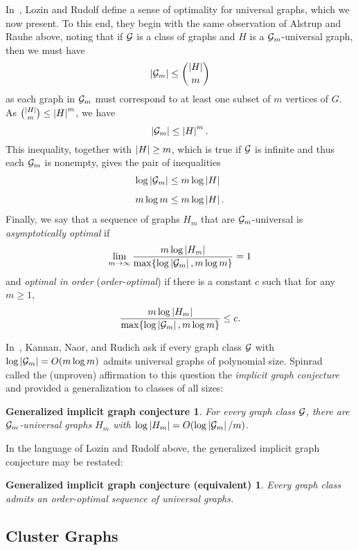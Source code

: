 In~\cite{lozin:minimal-univers:}, Lozin and Rudolf define a sense of optimality for universal graphs, which we now present. To this end, they begin with the same observation of Alstrup and Rauhe above, noting that if $\mathcal{G}$ is a class of graphs and $H$ is a $\mathcal{G}_m$-universal graph, then we must have 
\[	
	\left\lvert{ \mathcal{G}_m}\right\rvert
	\le
    \binom{\left\lvert{H}\right\rvert}{m}   
\]
as each graph in $\mathcal{G}_m$ must correspond to at least one subset of $m$ vertices of $G$. As $\binom{\left\lvert{H}\right\rvert}{m} \le \left\lvert{H}\right\rvert^m$, we have
\[
	\left\lvert{ \mathcal{G}_m}\right\rvert
	\le
	\left\lvert{H}\right\rvert^m.
\]
This inequality, together with $\left\lvert{H}\right\rvert \ge m$, which is true if $\mathcal{G}$ is infinite and thus each $\mathcal{G}_m$ is nonempty, gives the pair of inequalities
\begin{align*}
	\log\left\lvert{ \mathcal{G}_m}\right\rvert 
		&\le m \log \left\lvert{H}\right\rvert \\[5pt]
	m \log m 
		&\le m \log \left\lvert{H}\right\rvert.
\end{align*}
Finally, we say that a sequence of graphs $H_m$ that are $\mathcal{G}_m$-universal is \emph{asymptotically optimal} if
\[
	\lim_{m \to \infty}
	\dfrac{m \log \left\lvert{H_m}\right\rvert}{\max\{\log \left\lvert{ \mathcal{G}_m}\right\rvert, m \log m\}}
	=
	1
\]
and \emph{optimal in order} (\emph{order-optimal}) if there is a constant $c$ such that for any $m \ge 1$,
\[
	\dfrac{m \log \left\lvert{H_m}\right\rvert}{\max\{\log \left\lvert{ \mathcal{G}_m}\right\rvert, m \log m\}}
	\le 
	c.
\]

In~\cite{kannan:implicit-representation-1992:}, Kannan, Naor, and Rudich ask if every graph class $\mathcal{G}$ with $\log\left\lvert{ \mathcal{G}_m}\right\rvert = O{\left(m \log m\right)}$ admits universal graphs of polynomial size. Spinrad~\cite{spinrad:efficient-graph:} called the (unproven) affirmation to this question the \emph{implicit graph conjecture} and provided a generalization to classes of all sizes:
%
\newtheorem*{gen-implicit}{Generalized implicit graph conjecture}%
\begin{gen-implicit}
	For every graph class $\mathcal{G}$, there are $\mathcal{G}_m$-universal graphs $H_m$ with $\log\left\lvert{H_m}\right\rvert = O{\left(\log\left\lvert{ \mathcal{G}_m}\right\rvert/m\right)}$.
\end{gen-implicit}

In the language of Lozin and Rudolf above, the generalized implicit graph conjecture may be restated:
\newtheorem*{gen-implicit-equiv}{Generalized implicit graph conjecture (equivalent)}
\begin{gen-implicit-equiv}
	Every graph class admits an order-optimal sequence of universal graphs.
\end{gen-implicit-equiv}

\subsection{Cluster Graphs}
\label{subsec-graphs-cluster}

